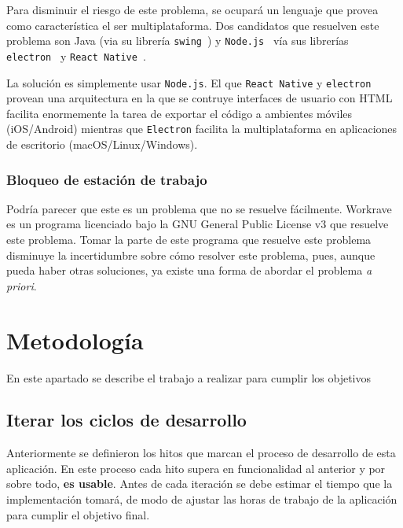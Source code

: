 \documentclass[12pt,letterpaper]{report}
\begin{document}
Para disminuir el riesgo de este problema, se ocupará un lenguaje que provea como característica el ser multiplataforma.
Dos candidatos que resuelven este problema son Java (via su librería \texttt{swing}~\cite{javaswing}) y
\texttt{Node.js}~\cite{nodejs} vía sus librerías \texttt{electron}~\cite{electron} y \texttt{React\
Native}~\cite{react-native}.

La solución es simplemente usar \texttt{Node.js}. El que \texttt{React Native} y \texttt{electron} provean una
arquitectura en la que se contruye interfaces de usuario con HTML facilita enormemente la tarea de exportar el código a
ambientes móviles (iOS/Android) mientras que \texttt{Electron} facilita la multiplataforma en aplicaciones de escritorio
(macOS/Linux/Windows).

\subsubsection{Bloqueo de estación de trabajo}\label{bloqueo-de-estacion-de-trabajo}

Podría parecer que este es un problema que no se resuelve fácilmente. Workrave~\cite{workrave} es un programa licenciado
bajo la GNU General Public License v3 que resuelve este problema. Tomar la parte de este programa que resuelve este
problema disminuye la incertidumbre sobre cómo resolver este problema, pues, aunque pueda haber otras soluciones, ya
existe una forma de abordar el problema \emph{a priori}.

\newpage
\section{Metodología}\label{metodologuxeda}

En este apartado se describe el trabajo a realizar para cumplir los
objetivos

\subsection{Iterar los ciclos de desarrollo}\label{iterar-los-ciclos-de-desarrollo}

Anteriormente se definieron los hitos que marcan el proceso de desarrollo de esta aplicación. En este proceso cada hito
supera en funcionalidad al anterior y por sobre todo, \textbf{es usable}. Antes de cada iteración se debe estimar el
tiempo que la implementación tomará, de modo de ajustar las horas de trabajo de la aplicación para cumplir el objetivo
final.
\end{document}
